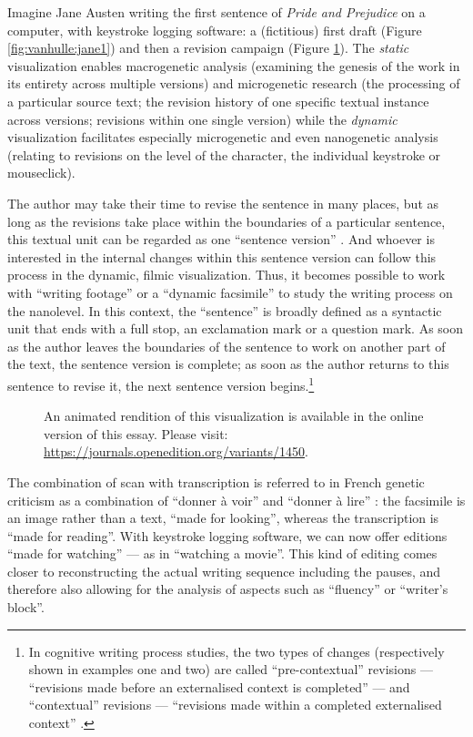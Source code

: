 \begin{paper}
\noindent Imagine Jane Austen writing the first sentence of \emph{Pride and
Prejudice} on a computer, with keystroke logging software: a
(fictitious) first draft (Figure \ref{fig:vanhulle:jane1}) and then a revision campaign
(Figure \ref{fig:vanhulle:jane2}). The \emph{static} visualization enables macrogenetic
analysis (examining the genesis of the work in its entirety across
multiple versions) and microgenetic research (the processing of a
particular source text; the revision history of one specific textual
instance across versions; revisions within one single version) while the
\emph{dynamic} visualization facilitates especially microgenetic and
even nanogenetic analysis (relating to revisions on the level of the
character, the individual keystroke or mouseclick).

The author may take their time to revise the sentence in many places,
but as long as the revisions take place within the boundaries of a
particular sentence, this textual unit can be regarded as one ``sentence
version'' \citep{van_hulle_logica_2019}. And whoever is interested in the internal
changes within this sentence version can follow this process in the
dynamic, filmic visualization. Thus, it becomes possible to work with
``writing footage'' or a ``dynamic facsimile'' to study the writing process
on the nanolevel. In this context, the ``sentence'' is broadly defined as
a syntactic unit that ends with a full stop, an exclamation mark or a
question mark. As soon as the author leaves the boundaries of the
sentence to work on another part of the text, the sentence version is
complete; as soon as the author returns to this sentence to revise it,
the next sentence version begins.\footnote{In cognitive writing process
  studies, the two types of changes (respectively shown in examples one
  and two) are called ``pre-contextual'' revisions --- ``revisions made
  before an externalised context is completed'' --- and ``contextual''
  revisions --- ``revisions made within a completed externalised context'' \citep[159]{lindgren_analysing_2006}.}

\begin{figure}[!ht]
    \centering
    \caption{An animated rendition of this visualization is available in the online version of this essay. Please visit: \url{https://journals.openedition.org/variants/1450}.}
    \label{fig:vanhulle:jane2}
\end{figure}

The combination of scan with transcription is referred to in French
genetic criticism as a combination of ``donner à voir'' and ``donner à
lire'' \citep[149]{gresillon_elements_2016}: the facsimile is an image rather than a
text, ``made for looking'', whereas the transcription is ``made for
reading''. With keystroke logging software, we can now offer editions
``made for watching'' --- as in ``watching a movie''. This kind of editing
comes closer to reconstructing the actual writing sequence including the
pauses, and therefore also allowing for the analysis of aspects such as
``fluency'' or ``writer's block''.


\end{paper}
